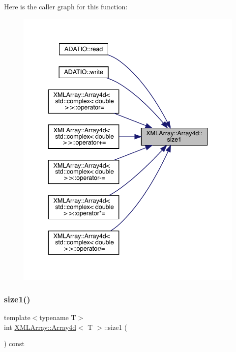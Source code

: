 Here is the caller graph for this function\+:
\nopagebreak
\begin{figure}[H]
\begin{center}
\leavevmode
\includegraphics[width=336pt]{de/d16/classXMLArray_1_1Array4d_a27899b6dccfd5d85d299da80da9a4c14_icgraph}
\end{center}
\end{figure}
\mbox{\label{classXMLArray_1_1Array4d_a27899b6dccfd5d85d299da80da9a4c14}} 
\subsubsection{\texorpdfstring{size1()}{size1()}\hspace{0.1cm}{\footnotesize\ttfamily [2/3]}}
{\footnotesize\ttfamily template$<$typename T$>$ \\
int \mbox{\hyperlink{classXMLArray_1_1Array4d}{X\+M\+L\+Array\+::\+Array4d}}$<$ T $>$\+::size1 (\begin{DoxyParamCaption}{ }\end{DoxyParamCaption}) const\hspace{0.3cm}{\ttfamily [inline]}}




